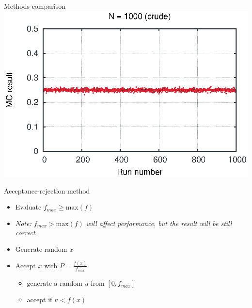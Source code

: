 \begin{emptyslide}{Methods comparison}
{    \includegraphics[width=\columnwidth]{img/int21000.eps}
  }

\vfill\null
\end{emptyslide}


\begin{slide}[toc=]{Acceptance-rejection method}
\null\vfill

  \twocolumn
  {
    
    \begin{itemize}
      \item Evaluate $f_{max} \geq \mbox{max}(f)$
      \item[] {\it\color{pdcolor3}Note: $f_{max} > \mbox{max}(f)$ will affect performance, but the result will be still correct}
      \item Generate random $x$
      \item Accept $x$ with $P = \frac{f(x)}{f_{max}}$
      \begin{itemize}
	\item generate a random $u$ from $[0, f_{max}]$
	\item accept if $u < f(x)$
      \end{itemize}
    \end{itemize}
  }
  {
    
    
  }

\vfill\null
\end{slide}


